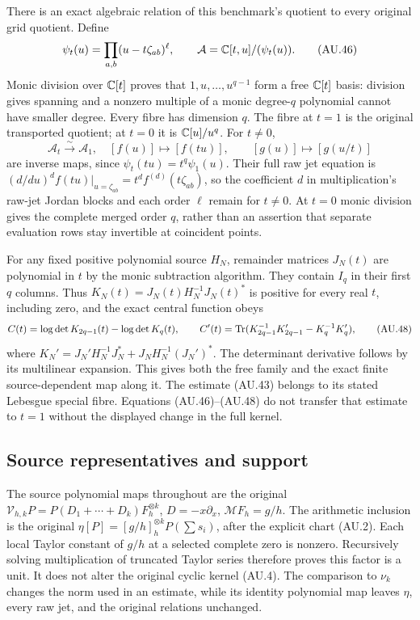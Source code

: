There is an exact algebraic relation of this benchmark's quotient to
every original grid quotient. Define
\[
 \psi_t(u)=\prod_{a,b}(u-t\zeta_{ab})^\ell,
 \qquad \mathcal A=\mathbb C[t,u]/(\psi_t(u)).                    \tag{AU.46}
\]
Monic division over $\mathbb C[t]$ proves that $1,u,\ldots,u^{q-1}$
form a free $\mathbb C[t]$ basis: division gives spanning and a nonzero
multiple of a monic degree-$q$ polynomial cannot have smaller degree.
Every fibre has dimension $q$. The fibre at $t=1$ is the original
transported quotient; at $t=0$ it is $\mathbb C[u]/u^q$. For $t\ne0$,
\[
 \mathcal A_t\xrightarrow{\sim}\mathcal A_1,
 \quad[f(u)]\longmapsto[f(tu)],\qquad
 [g(u)]\longmapsto[g(u/t)]                              \tag{AU.47}
\]
are inverse maps, since $\psi_t(tu)=t^q\psi_1(u)$.
Their full raw jet equation is
$(d/du)^d f(tu)|_{u=\zeta_{ab}}=t^df^{(d)}(t\zeta_{ab})$,
so the coefficient $d$ in multiplication's raw-jet Jordan blocks
and each order $\ell$ remain for $t\ne0$. At $t=0$ monic division
gives the complete merged order $q$, rather than an assertion that
separate evaluation rows stay invertible at coincident points.

For any fixed positive polynomial source $H_N$, remainder matrices
$J_N(t)$ are polynomial in $t$ by the monic subtraction algorithm.
They contain $I_q$ in their first $q$ columns. Thus
$K_N(t)=J_N(t)H_N^{-1}J_N(t)^*$ is positive for every real $t$,
including zero, and the exact central function obeys
\[
 C(t)=\log\det K_{2q-1}(t)-\log\det K_q(t),\qquad
 C'(t)=\operatorname{Tr}(K_{2q-1}^{-1}K_{2q-1}'-K_q^{-1}K_q'),
 \tag{AU.48}
\]
where $K_N'=J_N'H_N^{-1}J_N^*+J_NH_N^{-1}(J_N')^*$.
The determinant derivative follows by its multilinear expansion.
This gives both the free family and the exact finite source-dependent
map along it. The estimate (AU.43) belongs to its stated Lebesgue
special fibre. Equations (AU.46)--(AU.48) do not transfer that estimate
to $t=1$ without the displayed change in the full kernel.

\subsection{Source representatives and support}

The source polynomial maps throughout are the original
$\mathcal V_{h,k}P=P(D_1+\cdots+D_k)F_h^{\otimes k}$,
$D=-x\partial_x$, $\mathcal MF_h=g/h$.
The arithmetic inclusion is the original
$\eta[P]=[g/h]_h^{\otimes k}P(\sum s_i)$, after the explicit
chart (AU.2). Each local Taylor constant of $g/h$ at a selected
complete zero is nonzero. Recursively solving multiplication of
truncated Taylor series therefore proves this factor is a unit.
It does not alter the original cyclic kernel (AU.4).
The comparison to $\nu_k$ changes the norm used in an estimate,
while its identity polynomial map leaves $\eta$, every raw jet,
and the original relations unchanged.

